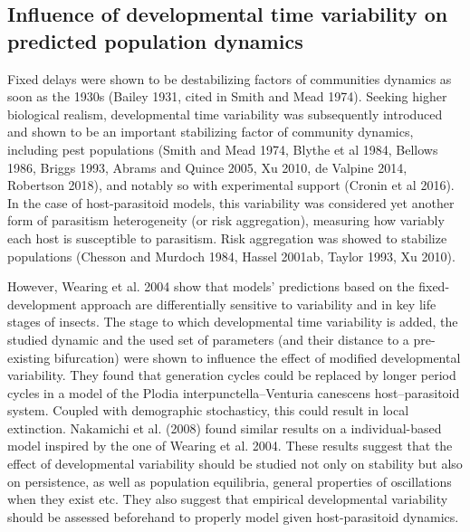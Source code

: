 \documentclass[12pt,a4paper,onecolumn]{article}
\begin{document}
\subsection{Influence of developmental time variability on predicted population dynamics}
\tabto{1 cm} Fixed delays were shown to be destabilizing factors of communities dynamics as soon as the 1930s (Bailey 1931, cited in Smith and Mead 1974). Seeking higher biological realism, developmental time variability was subsequently introduced and shown to be an important stabilizing factor of community dynamics, including pest populations (Smith and Mead 1974, Blythe et al 1984, Bellows 1986, Briggs 1993, Abrams and Quince 2005, Xu 2010, de Valpine 2014, Robertson 2018), and notably so with experimental support (Cronin et al 2016). In the case of host-parasitoid models, this variability was considered yet another form of parasitism heterogeneity (or risk aggregation), measuring how variably each host is susceptible to parasitism. Risk aggregation was showed to stabilize populations (Chesson and Murdoch 1984, Hassel 2001ab, Taylor 1993, Xu 2010). 

\tabto{1 cm} However, Wearing et al. 2004 show that models' predictions based on the fixed-development approach are differentially sensitive to variability and in key life stages of insects. The stage to which developmental time variability is added, the studied dynamic and the used set of parameters (and their distance to a pre-existing bifurcation) were shown to influence the effect of modified developmental variability. They found that generation cycles could be replaced by longer period cycles in a model of the Plodia interpunctella–Venturia canescens host–parasitoid system. Coupled with demographic stochasticy, this could result in local extinction. Nakamichi et al. (2008) found similar results on a individual-based model inspired by the one of Wearing et al. 2004. These results suggest that the effect of developmental variability should be studied not only on stability but also on persistence, as well as population equilibria, general properties of oscillations when they exist etc. They also suggest that empirical developmental variability should be assessed beforehand to properly model given host-parasitoid dynamics.  
\end{document}
